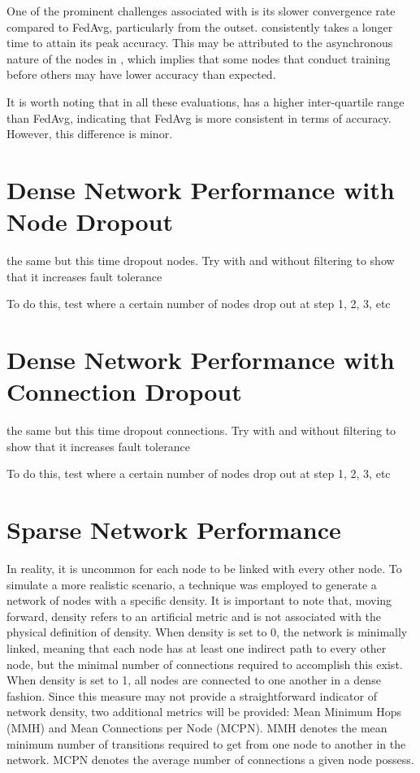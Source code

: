 One of the prominent challenges associated with \SL is its slower convergence rate compared to FedAvg, particularly from the outset. \SL consistently takes a longer time to attain its peak accuracy. This may be attributed to the asynchronous nature of the nodes in \SL, which implies that some nodes that conduct training before others may have lower accuracy than expected.

It is worth noting that in all these evaluations, \SL has a higher inter-quartile range than FedAvg, indicating that FedAvg is more consistent in terms of accuracy. However, this difference is minor.


\section{Dense Network Performance with Node Dropout}


the same but this time dropout nodes. Try with and without filtering to show that it increases fault tolerance

To do this, test where a certain number of nodes drop out at step 1, 2, 3, etc

\section{Dense Network Performance with Connection Dropout}


the same but this time dropout connections. Try with and without filtering to show that it increases fault tolerance

To do this, test where a certain number of nodes drop out at step 1, 2, 3, etc

\section{Sparse Network Performance}
In reality, it is uncommon for each node to be linked with every other node. To simulate a more realistic scenario, a technique was employed to generate a network of nodes with a specific density. It is important to note that, moving forward, density refers to an artificial metric and is not associated with the physical definition of density. When density is set to 0, the network is minimally linked, meaning that each node has at least one indirect path to every other node, but the minimal number of connections required to accomplish this exist. When density is set to 1, all nodes are connected to one another in a dense fashion. Since this measure may not provide a straightforward indicator of network density, two additional metrics will be provided:  Mean Minimum Hops (MMH) and Mean Connections per Node (MCPN). MMH denotes the mean minimum number of transitions required to get from one node to another in the network. MCPN denotes the average number of connections a given node possess.


